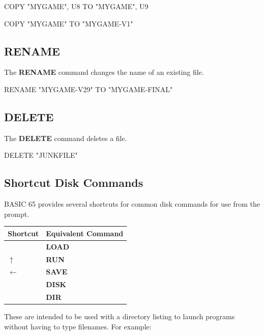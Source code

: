 \begin{screencode}
COPY "MYGAME", U8 TO "MYGAME", U9

COPY "MYGAME" TO "MYGAME-V1"
\end{screencode}

\subsection{RENAME}

The {\bf RENAME} command changes the name of an existing file.

\begin{screencode}
RENAME "MYGAME-V29" TO "MYGAME-FINAL"
\end{screencode}

\subsection{DELETE}

The {\bf DELETE} command deletes a file.

\begin{screencode}
DELETE "JUNKFILE"
\end{screencode}


\subsection{Shortcut Disk Commands}

BASIC 65 provides several shortcuts for common disk commands for use from the  prompt.

\begin{center}
\begin{tabular}{|l|l|}
\hline
{\bf Shortcut} & {\bf Equivalent Command} \\
\hline
\screentextwide{/} & {\bf LOAD} \\
\hline
$\uparrow$ & {\bf RUN} \\
\hline
$\leftarrow$ & {\bf SAVE} \\
\hline
\screentextwide{@} & {\bf DISK} \\
\hline
\screentextwide{\$} & {\bf DIR} \\
\hline
\end{tabular}
\end{center}

These are intended to be used with a directory listing to launch programs without having to type filenames. For example:

